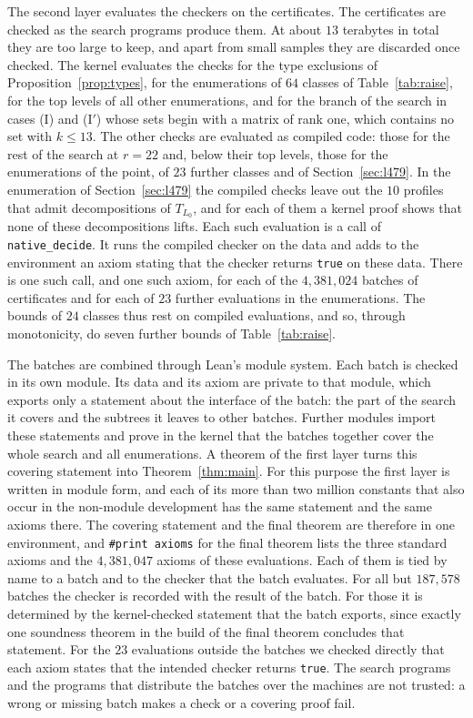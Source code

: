 \documentclass[11pt]{amsart}
\theoremstyle{definition}
\theoremstyle{remark}
\numberwithin{equation}{section}
\begin{document}
The second layer evaluates the checkers on the certificates. The certificates are checked as the search programs produce them. At about $13$ terabytes in total they are too large to keep, and apart from small samples they are discarded once checked. The kernel evaluates the checks for the type exclusions of Proposition~\ref{prop:types}, for the enumerations of $64$ classes of Table~\ref{tab:raise}, for the top levels of all other enumerations, and for the branch of the search in cases (I) and (I$'$) whose sets begin with a matrix of rank one, which contains no set with $k\le 13$. The other checks are evaluated as compiled code: those for the rest of the search at $r=22$ and, below their top levels, those for the enumerations of the point, of $23$ further classes and of Section~\ref{sec:l479}. In the enumeration of Section~\ref{sec:l479} the compiled checks leave out the $10$ profiles that admit decompositions of $T_{L_0}$, and for each of them a kernel proof shows that none of these decompositions lifts. Each such evaluation is a call of \texttt{native\_decide}. It runs the compiled checker on the data and adds to the environment an axiom stating that the checker returns \texttt{true} on these data. There is one such call, and one such axiom, for each of the $4{,}381{,}024$ batches of certificates and for each of $23$ further evaluations in the enumerations. The bounds of $24$ classes thus rest on compiled evaluations, and so, through monotonicity, do seven further bounds of Table~\ref{tab:raise}.

The batches are combined through Lean's module system. Each batch is checked in its own module. Its data and its axiom are private to that module, which exports only a statement about the interface of the batch: the part of the search it covers and the subtrees it leaves to other batches. Further modules import these statements and prove in the kernel that the batches together cover the whole search and all enumerations. A theorem of the first layer turns this covering statement into Theorem~\ref{thm:main}. For this purpose the first layer is written in module form, and each of its more than two million constants that also occur in the non-module development has the same statement and the same axioms there. The covering statement and the final theorem are therefore in one environment, and \texttt{\#print axioms} for the final theorem lists the three standard axioms and the $4{,}381{,}047$ axioms of these evaluations. Each of them is tied by name to a batch and to the checker that the batch evaluates. For all but $187{,}578$ batches the checker is recorded with the result of the batch. For those it is determined by the kernel-checked statement that the batch exports, since exactly one soundness theorem in the build of the final theorem concludes that statement. For the $23$ evaluations outside the batches we checked directly that each axiom states that the intended checker returns \texttt{true}. The search programs and the programs that distribute the batches over the machines are not trusted: a wrong or missing batch makes a check or a covering proof fail.
\end{document}
